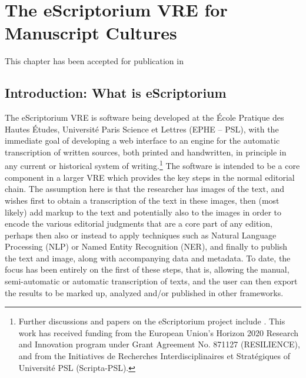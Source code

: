 ﻿\chapter{The eScriptorium VRE for Manuscript Cultures}
\thispagestyle{empty}
\vfill
This chapter has been accepted for publication in 
\newpage

\section{Introduction: What is eScriptorium}

The eScriptorium VRE is software being developed at the École Pratique des
Haut\-es Études, Université Paris Science et Lettres (EPHE – PSL), with the
immediate goal of developing a web interface to an engine for the automatic
transcription of written sources, both printed and handwritten, in principle in
any current or historical system of writing.\footnote{Further discussions and
papers on the eScriptorium project include
\cite{kiessling2019kraken,KiesslingEtAl2019eScrip, kiessling2019badam,
stokes2020escriptorium}. This work has received funding from the European
Union’s Horizon 2020 Research and Innovation program under Grant Agreement No.
871127 (RESILIENCE), and from the Initiatives de Recherches Interdisciplinaires
et Stratégiques of Université PSL (Scripta-PSL).} The software is intended to
be a core component in a larger VRE which provides the key steps in the normal
editorial chain. The assumption here is that the researcher has images of the
text, and wishes first to obtain a transcription of the text in these images,
then (most likely) add markup to the text and potentially also to the images in
order to encode the various editorial judgments that are a core part of any
edition, perhaps then also or instead to apply techniques such as Natural
Language Processing (NLP) or Named Entity Recognition (NER), and finally to
publish the text and image, along with accompanying data and metadata. To date,
the focus has been entirely on the first of these steps, that is, allowing the
manual, semi-automatic or automatic transcription of texts, and the user can
then export the results to be marked up, analyzed and/or published in other
frameworks.

